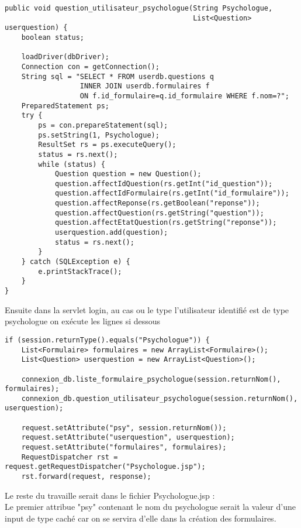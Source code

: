 \documentclass[12]{article}
\begin{document}
\begin{footnotesize}
\begin{lstlisting}
public void question_utilisateur_psychologue(String Psychologue,
											 List<Question> userquestion) {
	boolean status;

	loadDriver(dbDriver);
	Connection con = getConnection();
	String sql = "SELECT * FROM userdb.questions q 
				  INNER JOIN userdb.formulaires f 
				  ON f.id_formulaire=q.id_formulaire WHERE f.nom=?";
	PreparedStatement ps;
	try {
		ps = con.prepareStatement(sql);
		ps.setString(1, Psychologue);
		ResultSet rs = ps.executeQuery();
		status = rs.next();
		while (status) {
			Question question = new Question();
			question.affectIdQuestion(rs.getInt("id_question"));
			question.affectIdFormulaire(rs.getInt("id_formulaire"));
			question.affectReponse(rs.getBoolean("reponse"));
			question.affectQuestion(rs.getString("question"));
			question.affectEtatQuestion(rs.getString("reponse"));
			userquestion.add(question);
			status = rs.next();
		}
	} catch (SQLException e) {
		e.printStackTrace();
	}
}

\end{lstlisting}
\end{footnotesize}



\newpage

Ensuite dans la servlet login, au cas ou le type l'utilisateur identifié est de type psychologue on exécute les lignes si dessous

\begin{footnotesize}
\begin{lstlisting}
if (session.returnType().equals("Psychologue")) {
	List<Formulaire> formulaires = new ArrayList<Formulaire>();
	List<Question> userquestion = new ArrayList<Question>();
	
	connexion_db.liste_formulaire_psychologue(session.returnNom(), formulaires);
	connexion_db.question_utilisateur_psychologue(session.returnNom(), userquestion);
	
	request.setAttribute("psy", session.returnNom());
	request.setAttribute("userquestion", userquestion);
	request.setAttribute("formulaires", formulaires);
	RequestDispatcher rst = request.getRequestDispatcher("Psychologue.jsp");
	rst.forward(request, response);
\end{lstlisting}
\end{footnotesize}



Le reste du travaille serait dans le fichier Psychologue.jsp :\\
Le premier attribue "psy" contenant le nom du psychologue serait la valeur d'une input de type caché car on se servira d'elle dans la création des formulaires.\\
\end{document}
